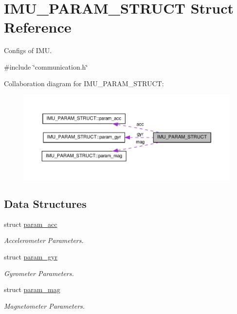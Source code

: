 \hypertarget{structIMU__PARAM__STRUCT}{\section{I\-M\-U\-\_\-\-P\-A\-R\-A\-M\-\_\-\-S\-T\-R\-U\-C\-T Struct Reference}
\label{structIMU__PARAM__STRUCT}
}


Configs of I\-M\-U.  




{\ttfamily \#include \char`\"{}communication.\-h\char`\"{}}



Collaboration diagram for I\-M\-U\-\_\-\-P\-A\-R\-A\-M\-\_\-\-S\-T\-R\-U\-C\-T\-:\nopagebreak
\begin{figure}[H]
\begin{center}
\leavevmode
\includegraphics[width=350pt]{structIMU__PARAM__STRUCT__coll__graph}
\end{center}
\end{figure}
\subsection*{Data Structures}
\begin{DoxyCompactItemize}
\item 
struct \hyperlink{structIMU__PARAM__STRUCT_1_1param__acc}{param\-\_\-acc}
\begin{DoxyCompactList}\small\item\em Accelerometer Parameters. \end{DoxyCompactList}\item 
struct \hyperlink{structIMU__PARAM__STRUCT_1_1param__gyr}{param\-\_\-gyr}
\begin{DoxyCompactList}\small\item\em Gyrometer Parameters. \end{DoxyCompactList}\item 
struct \hyperlink{structIMU__PARAM__STRUCT_1_1param__mag}{param\-\_\-mag}
\begin{DoxyCompactList}\small\item\em Magnetometer Parameters. \end{DoxyCompactList}\end{DoxyCompactItemize}
